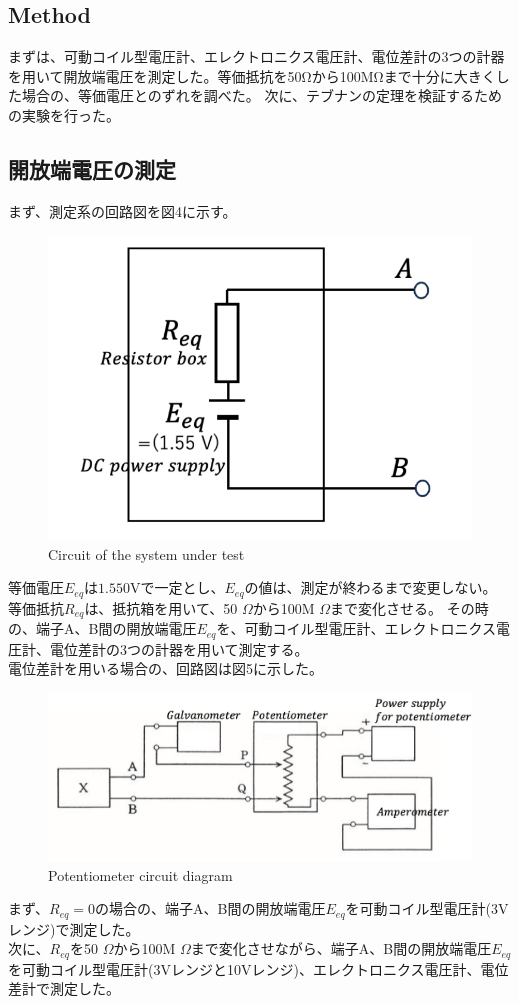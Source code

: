 \documentclass[a4paper,10pt]{jsarticle}
\begin{document}
\begin{multicols}{2}
\section{Method}
まずは、可動コイル型電圧計、エレクトロニクス電圧計、電位差計の3つの計器を用いて開放端電圧を測定した。等価抵抗を50Ωから100MΩまで十分に大きくした場合の、等価電圧とのずれを調べた。
次に、テブナンの定理を検証するための実験を行った。
\subsection{開放端電圧の測定}
まず、測定系の回路図を図4に示す。
\begin{figure}[H]
  \centering
  \includegraphics[width=0.8\linewidth]{figs/measuring_instrument.pdf}
  \caption{Circuit of the system under test}
  \label{fig:measuring_instrument}
\end{figure}
等価電圧$E_{eq}$は$1.550$Vで一定とし、$E_{eq}$の値は、測定が終わるまで変更しない。
等価抵抗$R_{eq}$は、抵抗箱を用いて、50 $\Omega$から100M $\Omega$まで変化させる。
その時の、端子A、B間の開放端電圧$E_{eq}$を、可動コイル型電圧計、エレクトロニクス電圧計、電位差計の3つの計器を用いて測定する。\\
電位差計を用いる場合の、回路図は図5に示した。\\
\begin{figure}[H]
  \centering
  \includegraphics[width=1\linewidth]{figs/Potentiometer_circuit_diagram.pdf}
  \caption{Potentiometer circuit diagram}
  \label{fig:potentiometer}
\end{figure}
まず、$R_{eq}=0$の場合の、端子A、B間の開放端電圧$E_{eq}$を可動コイル型電圧計(3Vレンジ)で測定した。\\
次に、$R_{eq}$を50 $\Omega$から100M $\Omega$まで変化させながら、端子A、B間の開放端電圧$E_{eq}$を可動コイル型電圧計(3Vレンジと10Vレンジ)、エレクトロニクス電圧計、電位差計で測定した。\\

\end{multicols}
\end{document}
